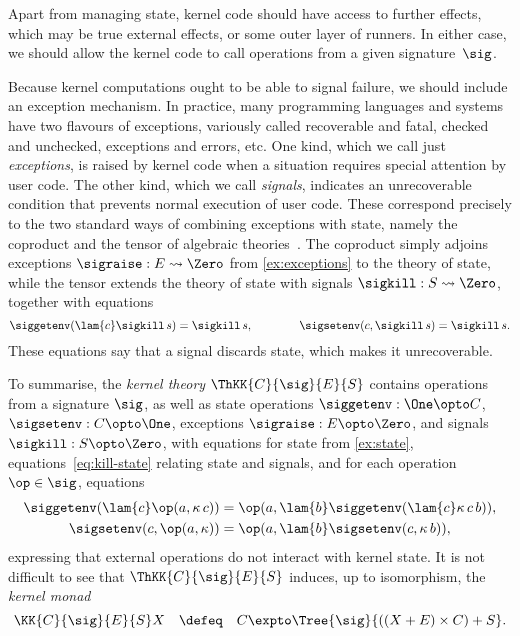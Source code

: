 Apart from managing state, kernel code should have access to further
effects, which may be true external effects, or some outer
layer of runners. In either case, we should allow the kernel code to call
operations from a given signature~$\sig$.

Because kernel computations ought to be able to signal failure, we should
include an exception mechanism. In practice, many programming languages and
systems have two flavours of exceptions, variously called recoverable and fatal,
checked and unchecked, exceptions and errors, etc. One kind, which we call just
\emph{exceptions}, is raised by kernel code when a situation requires special
attention by user code. The other kind, which we call \emph{signals},
indicates an unrecoverable condition that prevents normal execution of user
code. These correspond precisely to the two standard ways of combining
exceptions with state, namely the coproduct and the tensor of algebraic
theories~\cite{Hyland:CombiningEffects}. The coproduct simply adjoins exceptions
$\sigraise : E \leadsto \Zero$ from \cref{ex:exceptions} to the theory of
state, while the tensor extends the theory of state with signals
$\sigkill : S \leadsto \Zero$, together with equations
%
\begin{equation}
  \label{eq:kill-state}%
  \siggetenv(\lam{c} \sigkill\,s) = \sigkill\,s,
  \qquad\qquad
  \sigsetenv(c, \sigkill\,s) = \sigkill\,s.
\end{equation}
%
These equations say that a signal discards state, which makes it unrecoverable.

To summarise, the \emph{kernel theory} $\ThKK{C}{\sig}{E}{S}$ contains 
operations from a signature $\sig$, as well as state operations
$\siggetenv : \One \opto C$, $\sigsetenv : C \opto \One$, exceptions
$\sigraise : E \opto \Zero$, and signals $\sigkill : S \opto \Zero$, with equations for state
from \cref{ex:state}, equations~\eqref{eq:kill-state} relating state and
signals, and for each operation $\op \in \sig$, equations
%
\begin{align*}
  \siggetenv(\lam{c} \op(a, \kappa\,c)) &= \op(a, \lam{b} \siggetenv (\lam{c} \kappa\,c\,b)),\\
  \sigsetenv(c, \op(a, \kappa)) &= \op(a, \lam{b} \sigsetenv(c, \kappa\,b)),
\end{align*}
%
expressing that external operations do not interact with kernel state. 
It is not difficult to see that $\ThKK{C}{\sig}{E}{S}$ induces, up to
isomorphism, the \emph{kernel monad}
%
\begin{equation*}
  \KK{C}{\sig}{E}{S} X \quad\defeq\quad C \expto \Tree{\sig}{((X + E) \times C) + S}.
\end{equation*}

